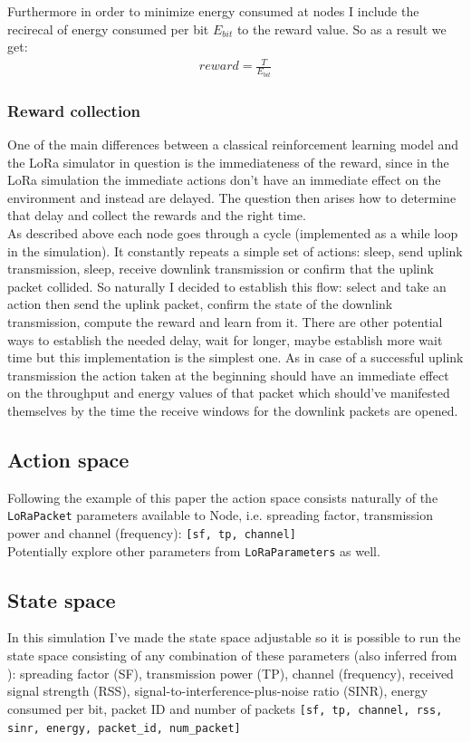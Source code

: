 Furthermore in order to minimize energy consumed at nodes I 
include the recirecal of energy consumed per bit $E_{bit}$ to the reward
value. So as a result we get:
\begin{align}
    reward = \frac{T}{E_{bit}}
\end{align}

\subsubsection{Reward collection}

One of the main differences between a classical reinforcement
learning model and the LoRa simulator in question is the immediateness of the reward, since in the LoRa simulation the immediate actions don't have an immediate effect on the environment and instead are delayed. The question then arises how to determine that delay and collect the rewards and the right time. \\

As described above each node goes through a cycle (implemented 
as a while loop in the simulation). It constantly repeats
a simple set of actions: sleep, send uplink transmission, sleep,
receive downlink transmission or confirm that the uplink 
packet collided. So naturally I decided to establish this flow:
select and take an action then send the uplink packet,
confirm the state of the downlink transmission, compute
the reward and learn from it. There are other potential 
ways to establish the needed delay, wait for longer, maybe 
establish more wait time but this implementation is the 
simplest one. As in case of a successful uplink transmission
the action taken at the beginning should have an immediate effect on the throughput and energy values of that packet 
which should've manifested themselves by the time the receive
windows for the downlink packets are opened. 

\subsection{Action space}
Following the example of this paper \cite{rl_lora_original} the action space consists naturally of the \texttt{LoRaPacket} 
parameters available to Node, i.e. spreading factor,
transmission power and channel (frequency): 
\texttt{[sf, tp, channel]} \\

Potentially explore other parameters from 
\texttt{LoRaParameters} as well.

\subsection{State space}
In this simulation I've made the state space adjustable 
so it is possible to run the state space consisting of any 
combination of these parameters (also inferred from
\cite{rl_lora_original}): spreading factor (SF), 
transmission power (TP), channel (frequency), received signal
strength (RSS), signal-to-interference-plus-noise ratio (SINR),
energy consumed per bit, packet ID and number of packets
\texttt{[sf, tp, channel, rss, sinr, energy, packet\_id, num\_packet]}

